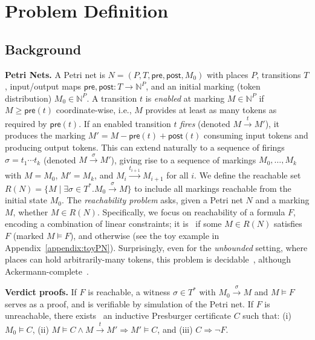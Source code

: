 
\section{Problem Definition}
\label{sec:problem-definition}


\subsection{Background}
\label{subsec:background}

\textbf{Petri Nets.} 
A Petri net is $N=(P,T,\mathsf{pre},\mathsf{post},M_0)$ with places $P$, transitions $T$, input/output maps $\mathsf{pre},\mathsf{post}:T\to\mathbb N^P$, and an initial marking (token distribution) $M_0\in\mathbb N^P$.  
A transition $t$ is \textit{enabled} at marking $M \in \mathbb N^P$ if $M\ge \mathsf{pre}(t)$ coordinate-wise, i.e., $M$ provides at least as many tokens as required by $\mathsf{pre}(t)$.
%
If an enabled transition \(t\) \textit{fires} (denoted $M\xrightarrow{t}M'$), it produces the marking $M' = M - \mathsf{pre}(t) + \mathsf{post}(t)$ consuming input tokens and producing output tokens.
%
This can extend naturally to a sequence of firings $\sigma = t_1\cdots t_k$ (denoted $M \xrightarrow{\sigma} M'$), giving rise to a sequence of markings $M_0,\ldots,M_k$ with $M=M_0$, $M'=M_k$, and $M_i \xrightarrow{t_{i+1}} M_{i+1}$ for all $i$. 
% 
We define the reachable set $R(N)=\{M \mid \exists \sigma\in T^*. M_0 \xrightarrow{\sigma} M\}$ to include all markings reachable from the initial state $M_0$.
% 
The \textit{reachability problem} asks, given a Petri net $N$ and a marking $M$, whether $M\in R(N)$. 
%
Specifically, we focus on reachability of a formula $F$, encoding a combination of linear constraints; it is \sat\ if some $M\in R(N)$ satisfies $F$ (marked $M \models F$), and otherwise \unsat{} (see the toy example in 	Appendix~\ref{appendix:toyPN}).
%
Surprisingly, even for the \textit{unbounded} setting, where places can hold arbitrarily-many tokens, this problem is decidable~\cite{Ma81,Ko82,La92}, although Ackermann-complete~\cite{CzWo22,Le22}.   



\medskip
\noindent
\textbf{Verdict proofs.} 
If $F$ is reachable, a witness $\sigma\in T^*$ with $M_0\xrightarrow{\sigma}M$ and $M\models F$ serves as a proof, and is verifiable by simulation of the Petri net.  
If $F$ is unreachable, there exists~\cite{Le09} an inductive Presburger certificate $C$ such that:  
(i) $M_0\models C$, (ii) $M\models C \wedge M\xrightarrow{t}M'\Rightarrow M'\models C$, and (iii) $C\Rightarrow \neg F$.

